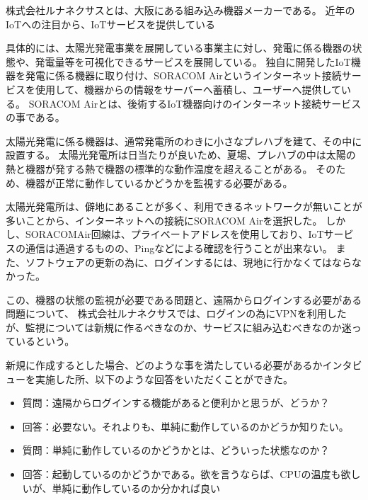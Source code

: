 
\begin{comment}
また、IoTサービスを開発しているルナネクサスさんへ聞き取りを行った。
・ルナネクサスさんの説明
・ルナネクサスさんが開発しているサービスの説明
・どのような点で困っているのか、等の聞き取り結果
\end{comment}

株式会社ルナネクサスとは、大阪にある組み込み機器メーカーである。
近年のIoTへの注目から、IoTサービスを提供している

具体的には、太陽光発電事業を展開している事業主に対し、発電に係る機器の状態や、発電量等を可視化できるサービスを展開している。
独自に開発したIoT機器を発電に係る機器に取り付け、SORACOM Airというインターネット接続サービスを使用して、機器からの情報をサーバーへ蓄積し、ユーザーへ提供している。
SORACOM Airとは、後術するIoT機器向けのインターネット接続サービスの事である。

太陽光発電に係る機器は、通常発電所のわきに小さなプレハブを建て、その中に設置する。
太陽光発電所は日当たりが良いため、夏場、プレハブの中は太陽の熱と機器が発する熱で機器の標準的な動作温度を超えることがある。
そのため、機器が正常に動作しているかどうかを監視する必要がある。

太陽光発電所は、僻地にあることが多く、利用できるネットワークが無いことが多いことから、インターネットへの接続にSORACOM Airを選択した。
しかし、SORACOMAir回線は、プライベートアドレスを使用しており、IoTサービスの通信は通過するものの、Pingなどによる確認を行うことが出来ない。
また、ソフトウェアの更新の為に、ログインするには、現地に行かなくてはならなかった。

この、機器の状態の監視が必要である問題と、遠隔からログインする必要がある問題について、
株式会社ルナネクサスでは、ログインの為にVPNを利用したが、監視については新規に作るべきなのか、サービスに組み込むべきなのか迷っているという。

新規に作成するとした場合、どのような事を満たしている必要があるかインタビューを実施した所、以下のような回答をいただくことができた。
\begin{itemize}
\item 質問：遠隔からログインする機能があると便利かと思うが、どうか？
\item 回答：必要ない。それよりも、単純に動作しているのかどうか知りたい。
\item 質問：単純に動作しているのかどうかとは、どういった状態なのか？
\item 回答：起動しているのかどうかである。欲を言うならば、CPUの温度も欲しいが、単純に動作しているのか分かれば良い
\end{itemize}


\begin{comment}
開発者の役に立つとは、どういうことなのか、

色々と制約があるが、簡単な監視ならできるのではないか、と思い試してみました。
本当はもう何回もやってみて、よりよいものにスべきところなのですが、
\end{comment}


